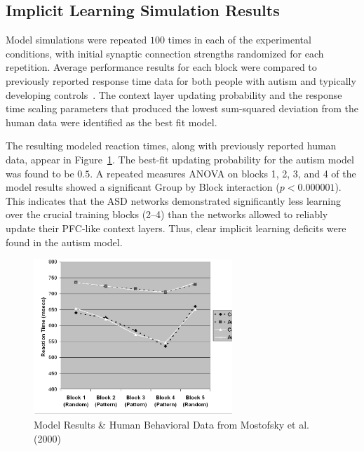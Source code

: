 \subsection{Implicit Learning Simulation Results}
Model simulations were repeated $100$ times in each of the experimental conditions, with initial synaptic connection strengths randomized for each repetition. Average performance results for each block were compared to previously reported response time data for both people with autism and typically developing controls~\cite{MostofskySH:2000:Procedural}. The context layer updating probability and the response time scaling parameters that produced the lowest sum-squared deviation from the human data were identified as the best fit model.

The resulting modeled reaction times, along with previously reported human data, appear in Figure~\ref{Model-Results}. The best-fit updating probability for the autism model was found to be $0.5$. A repeated measures ANOVA on blocks 1, 2, 3, and 4 of the model results showed a significant Group by Block interaction ($p < 0.000001$). This indicates that the ASD networks demonstrated significantly less learning over the crucial training blocks (2--4) than the networks allowed to reliably update their PFC-like context layers. Thus, clear implicit learning deficits were found in the autism model.


\begin{figure}[t]
\begin{center}
	\includegraphics[width=75mm]{graphs/srtt_chart.ps}
\end{center}
\caption{Model Results \& Human Behavioral Data from Mostofsky
         et al. (2000)} 
\label{Model-Results}
\end{figure} 

